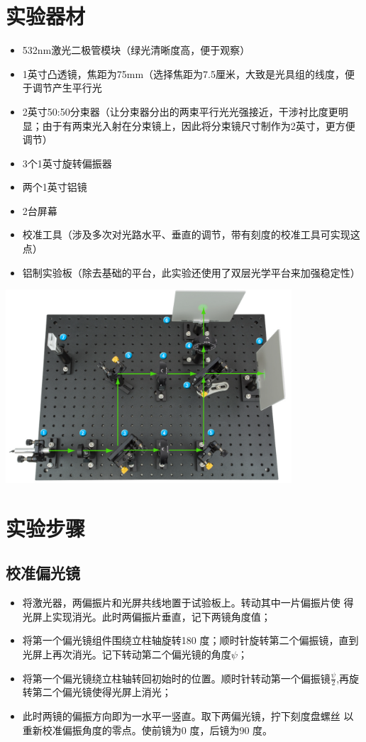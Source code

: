 \documentclass[10pt]{ctexart}
\begin{document}
\section{实验器材}
\begin{itemize}
    \item 532nm激光二极管模块（绿光清晰度高，便于观察）
    \item 1英寸凸透镜，焦距为75mm（选择焦距为7.5厘米，大致是光具组的线度，便于调节产生平行光
    \item 2英寸50:50分束器（让分束器分出的两束平行光光强接近，干涉衬比度更明显；由于有两束光入射在分束镜上，因此将分束镜尺寸制作为2英寸，更方便调节）
    \item 3个1英寸旋转偏振器
    \item 两个1英寸铝镜
    \item 2台屏幕
    \item 校准工具（涉及多次对光路水平、垂直的调节，带有刻度的校准工具可实现这点）
    \item 铝制实验板（除去基础的平台，此实验还使用了双层光学平台来加强稳定性）
\end{itemize}
\begin{minipage}{\textwidth} 
    \includegraphics[width=0.8\textwidth]{干涉仪光路图.png}
\end{minipage}
\newpage
\section{实验步骤}
\subsection{校准偏光镜}
\begin{itemize}
    \item 将激光器，两偏振片和光屏共线地置于试验板上。转动其中一片偏振片使
    得光屏上实现消光。此时两偏振片垂直，记下两镜角度值；
    \item 将第一个偏光镜组件围绕立柱轴旋转180 度；顺时针旋转第二个偏振镜，直到光屏上再次消光。记下转动第二个偏光镜的角度$\psi$；
    \item 将第一个偏光镜绕立柱轴转回初始时的位置。顺时针转动第一个偏振镜$\frac{\psi}{2}$,再旋转第二个偏光镜使得光屏上消光；
    \item 此时两镜的偏振方向即为一水平一竖直。取下两偏光镜，拧下刻度盘螺丝
    以重新校准偏振角度的零点。使前镜为0 度，后镜为90 度。
\end{itemize}
\end{document}
